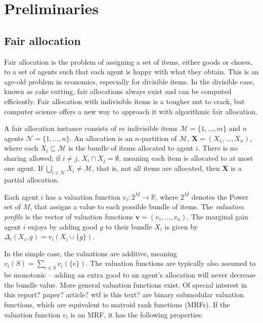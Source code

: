 \section{Preliminaries}

\subsection*{Fair allocation}
Fair allocation is the problem of assigning a set of items, either goods or chores, to a set of agents such that each agent is happy with what they obtain. This is an age-old problem in economics, especially for divisible items. In the divisible case, known as cake cutting, fair allocations always exist and can be computed efficiently. Fair allocation with indivisible items is a tougher nut to crack, but computer science offers a new way to approach it with algorithmic fair allocation.

A fair allocation instance consists of $m$ indivisible items $\mathcal{M} = \{1, \ldots ,m\}$ and $n$ agents $\mathcal{N} = \{1, \ldots ,n\}$. An allocation is an $n$-partition of $\mathcal{M}$, $\textbf{X} = (X_1, \ldots, X_n)$, where each $X_i \subseteq \mathcal{M}$ is the bundle of items allocated to agent $i$. There is no sharing allowed; if $i \not = j$, $X_i \cap X_j = \emptyset$, meaning each item is allocated to at most one agent. If $\bigcup_{i \in \mathcal{N} } X_i  \not =  \mathcal{M}$, that is, not all items are allocated, then $\textbf{X}$ is a partial allocation.

Each agent $i$ has a valuation function $v_i: 2^M \rightarrow \mathbb{R}$, where $2^M$ denotes the Power set of $M$, that assigns a value to each possible bundle of items. The \textit{valuation profile} is the vector of valuation functions $\mathbf{v} = (v_1, \ldots, v_n)$. The marginal gain agent $i$ enjoys by adding good $g$ to their bundle $X_i$ is given by $\Delta_i(X_i, g) = v_i(X_i \cup \{g\})$.

In the simple case, the valuations are additive, meaning $v_i(S) = \sum_{e \in S} v_i(\{e\})$. The valuation functions are typically also assumed to be monotonic – adding an extra good to an agent's allocation will never decrease the bundle value. More general valuation functions exist. Of special interest in this report? paper? article? wtf is this text? are binary submodular valuation functions, which are equivalent to matroid rank functions (MRFs). If the valuation function $v_i$ is an MRF, it has the following properties:

